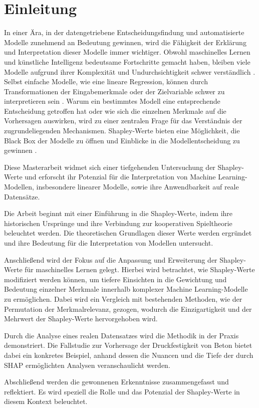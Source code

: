 \chapter{Einleitung}

In einer Ära, in der datengetriebene Entscheidungsfindung und automatisierte Modelle zunehmend an Bedeutung gewinnen,
wird die Fähigkeit der Erklärung und Interpretation dieser Modelle immer wichtiger. Obwohl maschinelles Lernen und
künstliche Intelligenz bedeutsame Fortschritte gemacht haben, bleiben viele Modelle aufgrund ihrer Komplexität und Undurchsichtigkeit
schwer verständlich \cite[S. 4f]{Molnar_2023}. Selbst einfache Modelle, wie eine lineare Regression,
können durch Transformationen der Eingabemerkmale oder der Zielvariable schwer zu interpretieren sein \cite[S. 6]{Molnar_2023}. 
Warum ein bestimmtes Modell eine entsprechende Entscheidung getroffen hat oder wie sich die einzelnen
Merkmale auf die Vorhersagen auswirken, wird zu einer zentralen Frage für das Verständnis der zugrundeliegenden Mechanismen. 
Shapley-Werte bieten eine Möglichkeit, die \glqq{}Black Box\grqq{} der Modelle zu öffnen und Einblicke 
in die Modellentscheidung zu gewinnen \cite[S. 215f]{Molnar_2022}. 

Diese Masterarbeit widmet sich einer tiefgehenden Untersuchung der Shapley-Werte und erforscht ihr Potenzial für die Interpretation
von Machine Learning-Modellen, insbesondere linearer Modelle, sowie ihre Anwendbarkeit auf reale Datensätze.

Die Arbeit beginnt mit einer Einführung in die Shapley-Werte, indem ihre historischen Ursprünge 
und ihre Verbindung zur kooperativen Spieltheorie beleuchtet werden. Die theoretischen Grundlagen dieser Werte werden 
ergründet und ihre Bedeutung für die Interpretation von Modellen untersucht.

Anschließend wird der Fokus auf die Anpassung und Erweiterung der Shapley-Werte für maschinelles Lernen gelegt. 
Hierbei wird betrachtet, wie Shapley-Werte modifiziert werden können, um tiefere Einsichten in die Gewichtung 
und Bedeutung einzelner Merkmale innerhalb komplexer Machine Learning-Modelle zu ermöglichen. Dabei wird ein Vergleich 
mit bestehenden Methoden, wie der Permutation der Merkmalrelevanz, gezogen, wodurch die Einzigartigkeit und der Mehrwert der 
Shapley-Werte hervorgehoben wird.

Durch die Analyse eines realen Datensatzes wird die Methodik in der Praxis demonstriert. Die Fallstudie zur Vorhersage der 
Druckfestigkeit von Beton bietet dabei ein konkretes Beispiel, anhand dessen die Nuancen und die Tiefe der durch SHAP 
ermöglichten Analysen veranschaulicht werden.

Abschließend werden die gewonnenen Erkenntnisse zusammengefasst und reflektiert. Es wird speziell die Rolle und das 
Potenzial der Shapley-Werte in diesem Kontext beleuchtet.